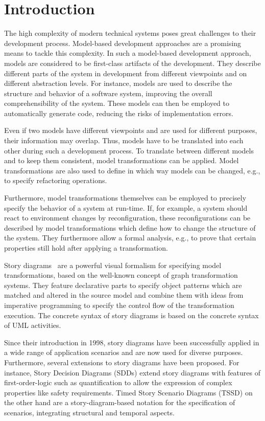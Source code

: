 \chapter{Introduction}
The high complexity of modern technical systems poses great challenges to their development process.
Model-based development approaches are a promising means to tackle this complexity.
In such a model-based development approach, models are considered to be first-class artifacts of the development.
They describe different parts of the system in development from different viewpoints and on different abstraction levels.
For instance, models are used to describe the structure and behavior of a software system, improving the overall comprehensibility of the system.
These models can then be employed to automatically generate code, reducing the risks of implementation errors.

Even if two models have different viewpoints and are used for different purposes, their information may overlap.
Thus, models have to be translated into each other during such a development process.
To translate between different models and to keep them consistent, model transformations can be applied.
Model transformations are also used to define in which way models can be changed, e.g., to specify refactoring operations.

Furthermore, model transformations themselves can be employed to precisely specify the behavior of a system at run-time.
If, for example, a system should react to environment changes by reconfiguration, these reconfigurations can be described by model transformations which define how to change the structure of the system.
They furthermore allow a formal analysis, e.g., to prove that certain properties still hold after applying a transformation.

Story diagrams~\cite{ZSW99,FNTZ00,Zun01} are a powerful visual formalism for specifying model transformations, based on the well-known concept of graph transformation systems.
They feature declarative parts to specify object patterns which are matched and altered in the source model and combine them with ideas from imperative programming to specify the control flow of the transformation execution.
The concrete syntax of story diagrams is based on the concrete syntax of UML activities.

Since their introduction in 1998, story diagrams have been successfully applied in a wide range of application scenarios and are now used for diverse purposes.
Furthermore, several extensions to story diagrams have been proposed.
For instance, Story Decision Diagrams (SDDs) \cite{GK06a} extend story diagrams with features of first-order-logic such as quantification to allow the expression of complex properties like safety requirements.
Timed Story Scenario Diagrams (TSSD) \cite{KG07a} on the other hand are a story-diagram-based notation for the specification of scenarios, integrating structural and temporal aspects.

